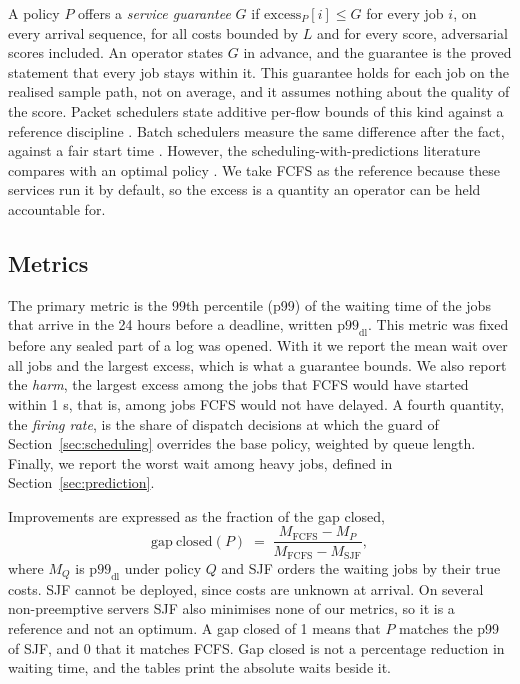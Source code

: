 A policy $P$ offers a \emph{service guarantee} $G$ if $\mathrm{excess}_P[i] \le G$ for every
job $i$, on every arrival sequence, for all costs bounded by $L$ and for every score,
adversarial scores included. An operator states $G$ in advance, and the guarantee is the
proved statement that every job stays within it. This guarantee
holds for each job on the realised sample path, not on average, and it assumes nothing about
the quality of the score. Packet schedulers state additive per-flow bounds of this kind
against a reference discipline \cite{parekh1993gps}. Batch schedulers measure the same
difference after the fact, against a fair start time \cite{sabin2004fairness}. However,
the scheduling-with-predictions literature compares with an optimal policy
\cite{purohit2018predictions,scully2022uniform}. We take FCFS as the reference because
these services run it by default, so the excess is a quantity an operator can be held
accountable for.

\subsection{Metrics}

The primary metric is the 99th percentile (p99) of the waiting time of the jobs that
arrive in the 24 hours before a deadline, written $\mathrm{p99}_{\mathrm{dl}}$. This metric
was fixed before any sealed part of a log was opened. With it we report the mean wait over
all jobs and the largest excess, which is what a guarantee bounds. We also report the
\emph{harm}, the largest excess among the jobs that FCFS would have started within 1 s, that
is, among jobs FCFS would not have delayed. A fourth quantity, the \emph{firing rate}, is
the share of dispatch decisions at which the guard of Section~\ref{sec:scheduling} overrides
the base policy, weighted by queue length. Finally, we report the worst wait among heavy
jobs, defined in Section~\ref{sec:prediction}.

Improvements are expressed as the fraction of the gap closed,
\begin{equation}
  \mathrm{gap\ closed}(P) \;=\;
  \frac{M_{\mathrm{FCFS}} - M_{P}}{M_{\mathrm{FCFS}} - M_{\mathrm{SJF}}} ,
  \label{eq:gapclosed}
\end{equation}
where $M_Q$ is $\mathrm{p99}_{\mathrm{dl}}$ under policy $Q$ and SJF orders the waiting
jobs by their true costs. SJF cannot be deployed, since costs are unknown at arrival. On
several non-preemptive servers SJF also minimises none of our metrics, so it is a reference
and not an optimum. A gap closed of 1 means that $P$ matches the p99 of SJF, and 0 that it
matches FCFS. Gap closed is not a percentage reduction in waiting time, and the tables
print the absolute waits beside it.

